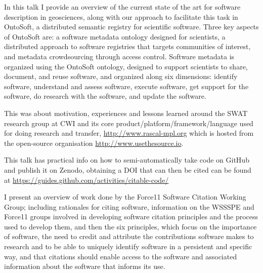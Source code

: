 \documentclass[a4paper,UKenglish]{dagrep}
\begin{document}

In this talk I provide an overview of the current state of the art for software description in geosciences, along with our approach to facilitate this task in OntoSoft, a distributed semantic registry for scientific software. Three key aspects of OntoSoft are: a software metadata ontology designed for scientists, a distributed approach to software registries that targets communities of interest, and metadata crowdsourcing through access control. Software metadata is organized using the OntoSoft ontology, designed to support scientists to share, document, and reuse software, and organized along six dimensions: identify software, understand and assess software, execute software, get support for the software, do research with the software, and update the software.


This was about motivation, experiences and lessons learned around the SWAT research group at CWI and its core product/platform/framework/language used for doing research and transfer, \url{http://www.rascal-mpl.org} which is hosted from the open-source organisation \url{http://www.usethesource.io}.


This talk has practical info on how to semi-automatically take code on GitHub and publish it on Zenodo, obtaining a DOI that can then be cited can be found at \url{https://guides.github.com/activities/citable-code/}

 I present an overview of work done by the Force11 Software Citation Working Group; including rationales for citing software, information on the WSSSPE and Force11 groups involved in developing software citation principles and the process used to develop them, and then the six principles, which focus on the importance of software, the need to credit and attribute the contributions software makes to research and to be able to uniquely identify software in a persistent and specific way, and that citations should enable access to the software and associated information about the software that informs its use. 
\end{document}
